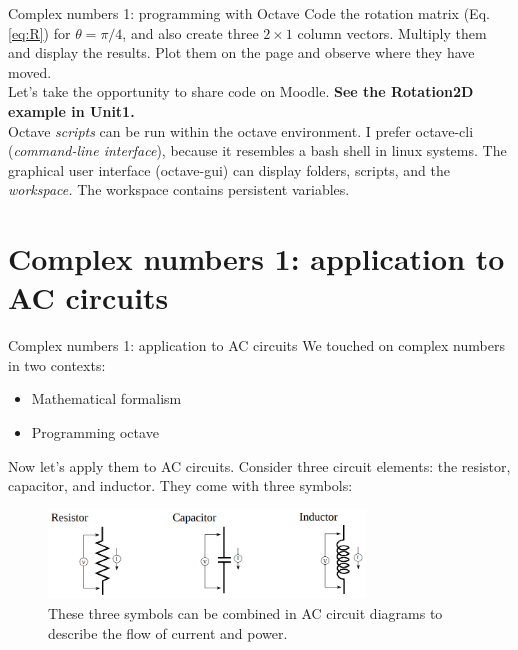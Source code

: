 \documentclass{beamer}
\begin{document}
\begin{frame}[fragile]{Complex numbers 1: programming with Octave}
Code the rotation matrix (Eq. \ref{eq:R}) for $\theta = \pi/4$, and also create three $2 \times 1$ column vectors.  Multiply them and display the results.  Plot them on the page and observe where they have moved. \\ \vspace{0.5cm}
\alert{Let's take the opportunity to share code on Moodle.}  \textbf{See the Rotation2D example in Unit1.} \\ \vspace{0.5cm}
Octave \textit{scripts} can be run within the octave environment.  I prefer octave-cli (\textit{command-line interface}), because it resembles a bash shell in linux systems.  The graphical user interface (octave-gui) can display folders, scripts, and the \textit{workspace.}  The workspace contains persistent variables.
\end{frame}

\section{Complex numbers 1: application to AC circuits}

\begin{frame}{Complex numbers 1: application to AC circuits}
\small
We touched on complex numbers in two contexts:
\begin{itemize}
\item Mathematical formalism
\item Programming octave
\end{itemize}
Now let's apply them to AC circuits.  Consider three circuit elements: the resistor, capacitor, and inductor.  They come with three symbols:
\begin{figure}
\centering
\includegraphics[width=0.75\textwidth]{figures/AC1.png}
\caption{\label{fig:AC1}  These three symbols can be combined in AC circuit diagrams to describe the flow of current and power.}
\end{figure}
\end{frame}
\end{document}
